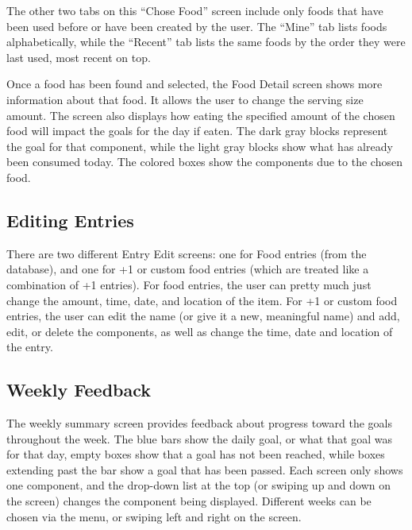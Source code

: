 The other two tabs on this ``Chose Food'' screen include only foods that have been used before or have been created by the user. The ``Mine'' tab lists foods alphabetically, while the ``Recent'' tab lists the same foods by the order they were last used, most recent on top. 

Once a food has been found and selected, the Food Detail screen shows more information about that food. It allows the user to change the serving size amount. The screen also displays how eating the specified amount of the chosen food will impact the goals for the day if eaten. The dark gray blocks represent the goal for that component, while the light gray blocks show what has already been consumed today. The colored boxes show the components due to the chosen food. 

\subsection{Editing Entries}

There are two different Entry Edit screens: one for Food entries (from the database), and one for +1 or custom food entries (which are treated like a combination of +1 entries). For food entries, the user can pretty much just change the amount, time, date, and location of the item. For +1 or custom food entries, the user can edit the name (or give it a new, meaningful name) and add, edit, or delete the components, as well as change the time, date and location of the entry.
 
\subsection{Weekly Feedback}

The weekly summary screen provides feedback about progress toward the goals throughout the week. The blue bars show the daily goal, or what that goal was for that day, empty boxes show that a goal has not been reached, while boxes extending past the bar show a goal that has been passed. Each screen only shows one component, and the drop-down list at the top (or swiping up and down on the screen) changes the component being displayed. Different weeks can be chosen via the menu, or swiping left and right on the screen. 

